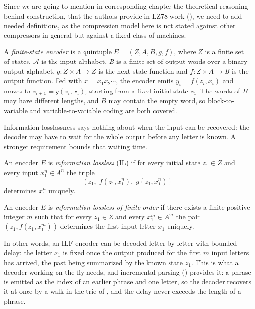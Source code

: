 Since we are going to mention in corresponding chapter the theoretical reasoning behind construction, that the authors provide in LZ78 work (\cite{ziv1978}), we need to add needed definitions, as the compression model here is not stated against other compressors in general but against a fixed class of machines.
\begin{definition}
\label{def:finite-state-encoder}
    A \emph{finite-state encoder} is a quintuple \(E = (Z, A, B, g, f)\), where \(Z\) is a finite set of states, \(\mathcal{A}\) is the input alphabet, \(B\) is a finite set of output words over a binary output alphabet, \(g : Z \times A \to Z\) is the next-state function and \(f : Z \times A \to B\) is the output function. Fed with \(x = x_1 x_2 \cdots\), the encoder emits \(y_i = f(z_i, x_i)\) and moves to \(z_{i+1} = g(z_i, x_i)\), starting from a fixed initial state \(z_1\). The words of \(B\) may have different lengths, and \(B\) may contain the empty word, so block-to-variable and variable-to-variable coding are both covered.
\end{definition}

Information losslessness says nothing about when the input can be recovered: the decoder may have to wait for the whole output before any letter is known. A stronger requirement bounds that waiting time.
\begin{definition}
\label{def:information-lossless}
    An encoder \(E\) is \emph{information lossless} (IL) if for every initial state \(z_1 \in Z\) and every input \(x_1^n \in A^n\) the triple
    \[
        \big(\, z_1, \; f(z_1, x_1^n), \; g(z_1, x_1^n) \,\big)
    \]
    determines \(x_1^n\) uniquely.
\end{definition}

\begin{definition}
\label{def:ilf}
    An encoder \(E\) is \emph{information lossless of finite order} if there exists a finite positive integer \(m\) such that for every \(z_1 \in Z\) and every \(x_1^m \in A^m\) the pair \((z_1, f(z_1, x_1^m))\) determines the first input letter \(x_1\) uniquely. 
\end{definition}
In other words, an \(\mathrm{ILF}\) encoder can be decoded letter by letter with bounded delay: the letter \(x_1\) is fixed once the output produced for the first \(m\) input letters has arrived, the past being summarized by the known state \(z_1\). This is what a decoder working on the fly needs, and incremental parsing () provides it: a phrase is emitted as the index of an earlier phrase and one letter, so the decoder recovers it at once by a walk in the trie of , and the delay never exceeds the length of a phrase.
\\


